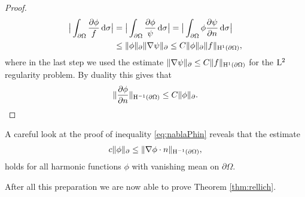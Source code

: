 \begin{proof}
\begin{align*}
    \big| \int_{\partial\Omega} \frac{\partial\phi} f \, {\operatorname{d}\!{\sigma}} \big|
    &= \big| \int_{\partial\Omega} \frac{\partial\phi} \psi \, {\operatorname{d}\!{\sigma}} \big|
    = \big| \int_{\partial\Omega} \phi \frac{\partial \psi}{\partial n} \, {\operatorname{d}\!{\sigma}} \big| \\
    &\leq \|\phi\|_{\partial} \|\nabla \psi \|_\partial 
    \leq C \|\phi\|_\partial \|f\|_{\mathrm{H}^1(\partial\Omega)},
  \end{align*}
  where in the last step we used the estimate $\|\nabla \psi\|_\partial \leq C \|f\|_{\mathrm{H}^1(\partial\Omega)}$ for the $\mathrm{L}^2$ regularity problem.
  By duality this gives that
  \begin{align*}
    \|\frac{\partial\phi}{\partial n} \|_{\mathrm{H}^{-1}(\partial\Omega)} \leq C \|\phi\|_\partial. 
  \end{align*}
\end{proof}

\begin{rem}
  \label{rem:harmonicEstimate}
  A careful look at the proof of inequality \eqref{eq:nablaPhin} reveals that the estimate
  \begin{align*}
    c \| \phi \|_\partial \leq \| \nabla \phi \cdot n \|_{\mathrm{H}^{-1}(\partial\Omega)},
  \end{align*}
  holds for all harmonic functions $\phi$ with vanishing mean on $\partial\Omega$.
\end{rem}

After all this preparation we are now able to prove Theorem \ref{thm:rellich}.

